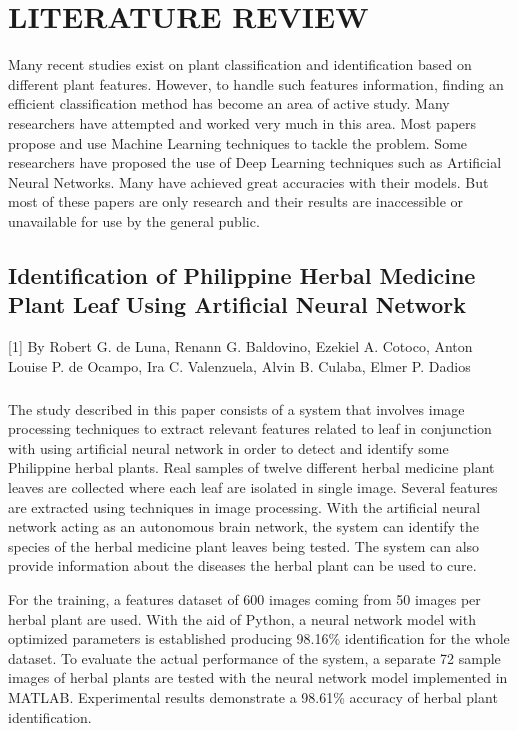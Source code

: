\chapter{LITERATURE REVIEW}
Many recent studies exist on plant classification and identification based on different plant features. However, to handle such features information, finding an efficient classification method has become an area of active study.
Many researchers have attempted and worked very much in this area. Most papers propose and use Machine Learning techniques to tackle the problem. Some researchers have proposed the use of Deep Learning techniques such as Artificial Neural Networks. Many have achieved great accuracies with their models. But most of these papers are only research and their results are inaccessible or unavailable for use by the general public.

\section{Identification of Philippine Herbal Medicine Plant Leaf Using Artificial Neural Network}
[1] By Robert G. de Luna, Renann G. Baldovino, Ezekiel A. Cotoco,
Anton Louise P. de Ocampo, Ira C. Valenzuela, Alvin B. Culaba, Elmer P. Dadios

\paragraph{}
The study described in this paper consists of a system
that involves image processing techniques to extract relevant
features related to leaf in conjunction with using artificial neural
network in order to detect and identify some Philippine herbal
plants. Real samples of twelve different herbal medicine plant
leaves are collected where each leaf are isolated in single image.
Several features are extracted using techniques in image
processing. With the artificial neural network acting as an
autonomous brain network, the system can identify the species of
the herbal medicine plant leaves being tested. The system can also
provide information about the diseases the herbal plant can be used to cure.

For the training, a features dataset of 600 images coming from
50 images per herbal plant are used. With the aid of Python, a
neural network model with optimized parameters is established
producing 98.16\% identification for the whole dataset. To evaluate
the actual performance of the system, a separate 72 sample images
of herbal plants are tested with the neural network model
implemented in MATLAB. Experimental results demonstrate a
98.61\% accuracy of herbal plant identification.\\

